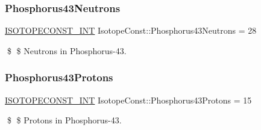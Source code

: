 \subsubsection{\texorpdfstring{Phosphorus43\+Neutrons}{Phosphorus43Neutrons}}
{\footnotesize\ttfamily \mbox{\hyperlink{group___isotope_const-_macros_ga5f18360b3e99483a35c32d789e62621c}{I\+S\+O\+T\+O\+P\+E\+C\+O\+N\+S\+T\+\_\+\+I\+NT}} Isotope\+Const\+::\+Phosphorus43\+Neutrons = 28}

\$ \$ Neutrons in Phosphorus-\/43. \mbox{\label{group___isotope_const-_phosphorus-_p43_gaa66150e4685969922d7c622515d3e7bc}} 
\subsubsection{\texorpdfstring{Phosphorus43\+Protons}{Phosphorus43Protons}}
{\footnotesize\ttfamily \mbox{\hyperlink{group___isotope_const-_macros_ga5f18360b3e99483a35c32d789e62621c}{I\+S\+O\+T\+O\+P\+E\+C\+O\+N\+S\+T\+\_\+\+I\+NT}} Isotope\+Const\+::\+Phosphorus43\+Protons = 15}

\$ \$ Protons in Phosphorus-\/43. 